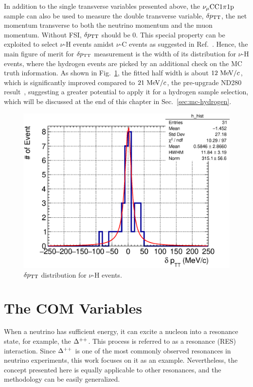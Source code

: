      In addition to the single transverse variables presented above, the $\nu_{\mu}\textrm{CC}1\pi1\textrm{p}$ sample can also be used to measure the double transverse variable, $\delta p_\textrm{TT}$, the net momentum transverse to both the neutrino momentum and the muon momentum.
     Without FSI, $\delta p_\textrm{TT}$ should be $0$. 
     This special property can be exploited to select $\nu$-H events amidst $\nu$-C events as suggested in Ref.~\cite{Lu:2015hea}. 
     Hence, the main figure of merit for $\delta p_\textrm{TT}$ measurement is the width of its distribution for $\nu$-H events, where the hydrogen events are picked by an additional check on the MC truth information.
     As shown in Fig.~\ref{fig:1pi-tki-dptt}, the fitted half width is about $12~\textrm{MeV}/c$, which is significantly improved compared to $21~\textrm{MeV}/c$, the pre-upgrade ND280 result~\cite{Lu:2015hea}, suggesting a greater potential to apply it for a hydrogen sample selection, which will be discussed at the end of this chapter in Sec.~\ref{sec:mc-hydrogen}.
     \begin{figure}[!htb] 
          \centering 		
          \includegraphics[width=\sgfigwid\textwidth]{figures/perf/tki/SFGpTPCmu_dptt_hist_al15_H_bin100_range500_Lfit.eps}
          \caption{\label{fig:1pi-tki-dptt} $\delta p_\textrm{TT}$ distribution for $\nu$-H events.} 
     \end{figure}


\section{The COM Variables}
\label{sec:mc-com}
When a neutrino has sufficient energy, it can excite a nucleon into a resonance state, for example, the $\Delta^{++}$. 
This process is referred to as a resonance (RES) interaction.
Since $\Delta^{++}$ is one of the most commonly observed resonances in neutrino experiments, this work focuses on it as an example.
Nevertheless, the concept presented here is equally applicable to other resonances, and the methodology can be easily generalized.

